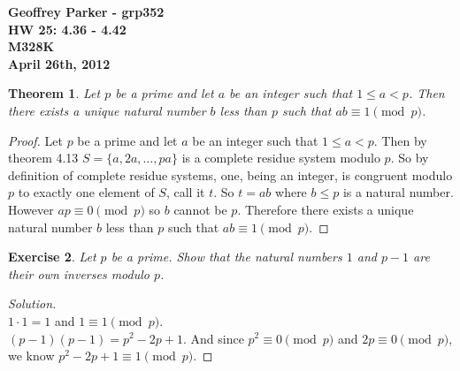 \documentclass[12pt,leqno]{article}
\numberwithin{equation}{section}
\newtheorem{thm}{Theorem}[section]
\newtheorem{exer}[thm]{Exercise}
\theoremstyle{definition}
\begin{document}
\thispagestyle{plain}
\begin{flushright}
\large{\textbf{Geoffrey Parker - grp352 \\
HW 25: 4.36 - 4.42\\
M328K \\
April 26th, 2012 \\}}
\end{flushright}

\markboth{}{} \setcounter{section}{0} \baselineskip=18pt

\setcounter{tocdepth}{4}



\setcounter{section}{4}

\setcounter{thm}{35}

\begin{thm}
Let $p$ be a prime and let $a$ be an integer such that $1 \leq a <
p$.  Then there exists a unique natural number $b$ less than $p$
such that $ab \equiv 1 \pmod{p}$.
\end{thm}
\begin{proof}[Proof]
Let $p$ be a prime and let $a$ be an integer such that $1 \leq a < p$.  Then by theorem 4.13 $S = \{a, 2a, \dots, pa\}$ is a complete residue system modulo $p$.  So by definition of complete residue systems, one, being an integer, is congruent modulo $p$ to exactly one element of $S$, call it $t$.  So $t = ab$ where $b \leq p$ is a natural number.  However $ap \equiv 0 \pmod{p}$ so $b$ cannot be $p$.  Therefore there exists a unique natural number $b$ less than $p$ such that $ab \equiv 1 \pmod{p}$.
\end{proof}

\begin{exer}
Let $p$ be a prime. Show that the natural numbers $1$ and $p-1$ are
their own inverses modulo $p$.
\end{exer}
\begin{proof}[Solution]$ $\\
$1 \cdot 1 = 1$ and $1 \equiv 1 \pmod{p}$.\\
$(p-1)(p-1) = p^2 - 2p + 1$.  And since $p^2 \equiv 0 \pmod{p}$ and $2p \equiv 0 \pmod{p}$, we know $p^2 - 2p + 1 \equiv 1 \pmod{p}$.
\end{proof}
\end{document}
